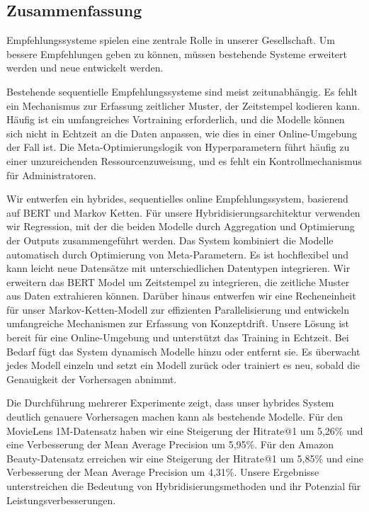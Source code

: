 \begin{center}
    \subsection*{Zusammenfassung}
\end{center}
\thispagestyle{empty}
Empfehlungssysteme spielen eine zentrale Rolle in unserer Gesellschaft. Um bessere Empfehlungen geben zu können, müssen bestehende Systeme erweitert werden und neue entwickelt werden.

Bestehende sequentielle Empfehlungssysteme sind meist zeitunabhängig. Es fehlt ein Mechanismus zur Erfassung zeitlicher Muster, der Zeitstempel kodieren kann. Häufig ist ein umfangreiches Vortraining erforderlich, und die Modelle können sich nicht in Echtzeit an die Daten anpassen, wie dies in einer Online-Umgebung der Fall ist. Die Meta-Optimierungslogik von Hyperparametern führt häufig zu einer unzureichenden Ressourcenzuweisung, und es fehlt ein Kontrollmechanismus für Administratoren.

Wir entwerfen ein hybrides, sequentielles online Empfehlungssystem, basierend auf BERT und Markov Ketten. Für unsere Hybridisierungsarchitektur verwenden wir Regression,
mit der die beiden Modelle durch Aggregation und Optimierung der Outputs zusammengeführt werden. Das System kombiniert die Modelle automatisch durch Optimierung von Meta-Parametern. Es ist hochflexibel und kann leicht neue Datensätze mit unterschiedlichen Datentypen integrieren. Wir erweitern das BERT Model um Zeitstempel zu integrieren, die zeitliche Muster aus Daten extrahieren können. Darüber hinaus entwerfen wir eine Recheneinheit für unser Markov-Ketten-Modell zur effizienten Parallelisierung und entwickeln umfangreiche Mechanismen zur Erfassung von Konzeptdrift. Unsere Lösung ist bereit für eine Online-Umgebung und unterstützt das Training in Echtzeit. Bei Bedarf fügt das System dynamisch Modelle hinzu oder entfernt sie. Es überwacht jedes Modell einzeln und setzt ein Modell zurück oder trainiert es neu, sobald die Genauigkeit der Vorhersagen abnimmt. 

Die Durchführung mehrerer Experimente zeigt, dass unser hybrides System deutlich genauere Vorhersagen machen kann als bestehende Modelle. Für den MovieLens 1M-Datensatz haben wir eine Steigerung der Hitrate@1 um  5,26\% und eine Verbesserung der Mean Average Precision um 5,95\%. Für den Amazon Beauty-Datensatz erreichen wir eine Steigerung der Hitrate@1 um 5,85\% und eine Verbesserung der Mean Average Precision um 4,31\%. Unsere Ergebnisse unterstreichen die Bedeutung von Hybridisierungsmethoden und ihr Potenzial für Leistungsverbesserungen.
\thispagestyle{empty}



